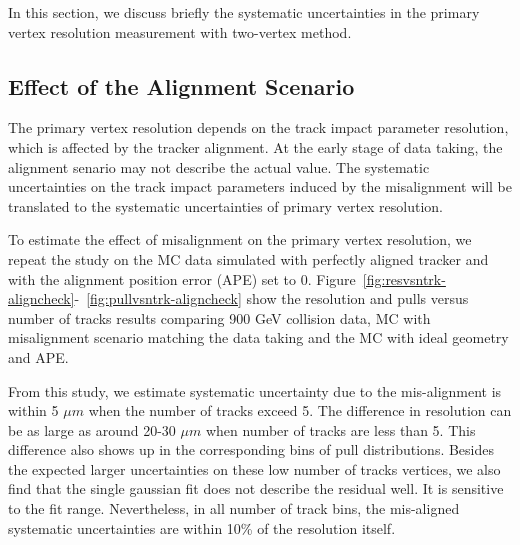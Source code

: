 In this section, we discuss briefly the systematic uncertainties in 
the primary vertex resolution measurement with two-vertex method.

\subsection{Effect of the Alignment Scenario}
\label{sub:alignsys}

The primary vertex resolution depends on the track impact parameter 
resolution, which is affected by the tracker alignment. 
At the early stage of data taking, the alignment senario may 
not describe the actual value. 
The systematic uncertainties on the track impact parameters induced 
by the misalignment will be translated to the systematic uncertainties
of primary vertex resolution. 

To estimate the effect of misalignment on the primary vertex resolution, 
we repeat the study on the MC data simulated with perfectly 
aligned tracker and with the alignment position error (APE) set to 0. 
Figure~\ref{fig:resvsntrk-aligncheck}-~\ref{fig:pullvsntrk-aligncheck} 
show the resolution and pulls versus number of tracks results comparing 
900 GeV collision data, MC with misalignment scenario matching 
the data taking and the MC with ideal geometry and APE.

From this study, we estimate systematic uncertainty due to the mis-alignment 
is within 5 $\mu m$ when the number of tracks exceed 5. 
The difference in resolution can be as large as around 20-30 $\mu m$ when 
number of tracks are less than 5. 
This difference also shows up in the corresponding bins of 
pull distributions. Besides the expected larger uncertainties on these 
low number of tracks vertices, we also find that the single 
gaussian fit does not describe the residual well. 
It is sensitive to the fit range. 
Nevertheless, in all number of track bins, the mis-aligned systematic 
uncertainties are within 10\% of the resolution itself. 

